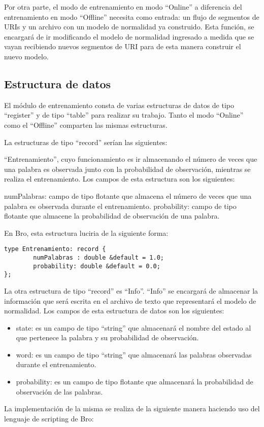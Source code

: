 Por otra parte, el modo de entrenamiento en modo “Online” a diferencia del entrenamiento en modo “Offline” necesita como entrada: un flujo de segmentos de URIs y un archivo con un modelo de normalidad ya construido. Esta función, se encargará de ir modificando el modelo de normalidad ingresado a medida que se vayan recibiendo nuevos segmentos de URI para de esta manera construir el nuevo modelo.

\subsection{Estructura de datos}\label{sub:estructuraEntrenamiento}
El módulo de entrenamiento consta de varias estructuras de datos de tipo “register” y de tipo “table” para realizar su trabajo. Tanto el modo “Online” como el “Offline” comparten las mismas estructuras.

La estructuras de tipo “record” serían las siguientes:

“Entrenamiento”, cuyo funcionamiento es ir almacenando el número de veces que una palabra es observada junto con la probabilidad de observación, mientras se realiza el entrenamiento. Los campos de esta estructura son los siguientes:

numPalabras: campo de tipo flotante que almacena el número de veces que una palabra es observada durante el entrenamiento.
probability: campo de tipo flotante que almacene la probabilidad de observación de una palabra.

En Bro, esta estructura luciria de la siguiente forma:

\begin{verbatim}
type Entrenamiento: record { 
        numPalabras : double &default = 1.0;
        probability: double &default = 0.0;
};
\end{verbatim}

La otra estructura de tipo “record” es “Info”. “Info” se encargará de almacenar la información que será escrita en el archivo de texto que representará el modelo de normalidad. Los campos de esta estructura de datos son los siguientes:

\begin{itemize}
\item state: es un campo de tipo “string” que almacenará el nombre del estado al que pertenece la palabra y su probabilidad de observación.
\item word: es un campo de tipo “string” que almacenará las palabras observadas durante el entrenamiento.
\item probability: es un campo de tipo flotante que almacenará la probabilidad de observación de las palabras. 
\end{itemize}
La implementación de la misma se realiza de la siguiente manera haciendo uso del lenguaje de scripting de Bro:

